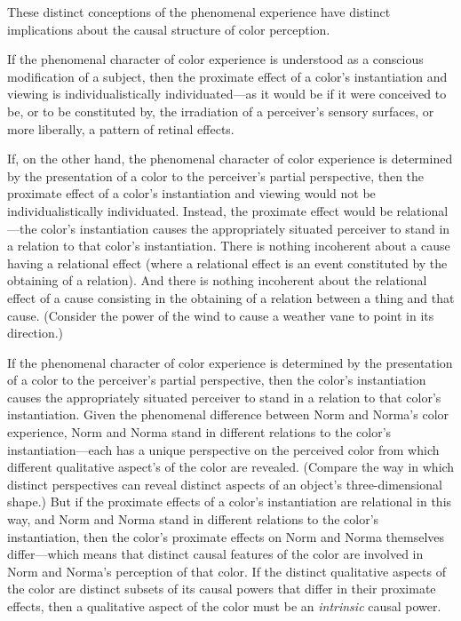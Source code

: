 \documentclass[12pt]{article}
\begin{document}
These distinct conceptions of the phenomenal experience have distinct implications about the causal structure of color perception. 

If the phenomenal character of color experience is understood as a conscious modification of a subject, then the proximate effect of a color's instantiation and viewing is individualistically individuated---as it would be if it were conceived to be, or to be constituted by, the irradiation of a perceiver's sensory surfaces, or more liberally, a pattern of retinal effects. 

If, on the other hand, the phenomenal character of color experience is determined by the presentation of a color to the perceiver's partial perspective, then the proximate effect of a color's instantiation and viewing would not be individualistically individuated. Instead, the proximate effect would be relational---the color's instantiation causes the appropriately situated perceiver to stand in a relation to that color's instantiation. There is nothing incoherent about a cause having a relational effect (where a relational effect is an event constituted by the obtaining of a relation). And there is nothing incoherent about the relational effect of a cause consisting in the obtaining of a relation between a thing and that cause. (Consider the power of the wind to cause a weather vane to point in its direction.)

If the phenomenal character of color experience is determined by the presentation of a color to the perceiver's partial perspective, then the color's instantiation causes the appropriately situated perceiver to stand in a relation to that color's instantiation. Given the phenomenal difference between Norm and Norma's color experience, Norm and Norma stand in different relations to the color's instantiation---each has a unique perspective on the perceived color from which different qualitative aspect's of the color are revealed. (Compare the way in which distinct perspectives can reveal distinct aspects of an object's three-dimensional shape.) But if the proximate effects of a color's instantiation are relational in this way, and Norm and Norma stand in different relations to the color's instantiation, then the color's proximate effects on Norm and Norma themselves differ---which means that distinct causal features of the color are involved in Norm and Norma's perception of that color. If the distinct qualitative aspects of the color are distinct subsets of its causal powers that differ in their proximate effects, then a qualitative aspect of the color must be an \emph{intrinsic} causal power.
\end{document}
